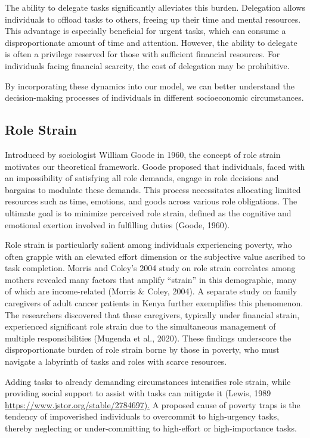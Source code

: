 \documentclass[
]{report}
\begin{document}
The ability to delegate tasks significantly alleviates this burden.
Delegation allows individuals to offload tasks to others, freeing up
their time and mental resources. This advantage is especially beneficial
for urgent tasks, which can consume a disproportionate amount of time
and attention. However, the ability to delegate is often a privilege
reserved for those with sufficient financial resources. For individuals
facing financial scarcity, the cost of delegation may be prohibitive.

By incorporating these dynamics into our model, we can better understand
the decision-making processes of individuals in different socioeconomic
circumstances.

\hypertarget{role-strain}{%
\subsection{Role Strain}\label{role-strain}}

Introduced by sociologist William Goode in 1960, the concept of role
strain motivates our theoretical framework. Goode proposed that
individuals, faced with an impossibility of satisfying all role demands,
engage in role decisions and bargains to modulate these demands. This
process necessitates allocating limited resources such as time,
emotions, and goods across various role obligations. The ultimate goal
is to minimize perceived role strain, defined as the cognitive and
emotional exertion involved in fulfilling duties (Goode, 1960).

Role strain is particularly salient among individuals experiencing
poverty, who often grapple with an elevated effort dimension or the
subjective value ascribed to task completion. Morris and Coley's 2004
study on role strain correlates among mothers revealed many factors that
amplify ``strain'' in this demographic, many of which are income-related
(Morris \& Coley, 2004). A separate study on family caregivers of adult
cancer patients in Kenya further exemplifies this phenomenon. The
researchers discovered that these caregivers, typically under financial
strain, experienced significant role strain due to the simultaneous
management of multiple responsibilities (Mugenda et al., 2020). These
findings underscore the disproportionate burden of role strain borne by
those in poverty, who must navigate a labyrinth of tasks and roles with
scarce resources.

Adding tasks to already demanding circumstances intensifies role strain,
while providing social support to assist with tasks can mitigate it
(Lewis, 1989 \url{https://www.jstor.org/stable/2784697).} A proposed
cause of poverty traps is the tendency of impoverished individuals to
overcommit to high-urgency tasks, thereby neglecting or under-committing
to high-effort or high-importance tasks.
\end{document}
